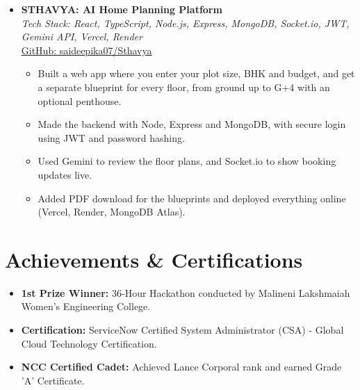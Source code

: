 \documentclass[letterpaper,11pt]{article}
\begin{document}
\begin{itemize}[leftmargin=0.15in, label={}]
\begin{itemize}
        \item Added JWT login, role-based access and private document storage on Cloudinary, and deployed it on Vercel, Render and MongoDB Atlas.
      \end{itemize}
    \item
      \textbf{STHAVYA: AI Home Planning Platform} \\
      \textit{Tech Stack: React, TypeScript, Node.js, Express, MongoDB, Socket.io, JWT, Gemini API, Vercel, Render} \\
      \href{https://github.com/saideepika07/Sthavya}{\underline{GitHub: saideepika07/Sthavya}}
      \begin{itemize}
        \item Built a web app where you enter your plot size, BHK and budget, and get a separate blueprint for every floor, from ground up to G+4 with an optional penthouse.
        \item Made the backend with Node, Express and MongoDB, with secure login using JWT and password hashing.
        \item Used Gemini to review the floor plans, and Socket.io to show booking updates live.
        \item Added PDF download for the blueprints and deployed everything online (Vercel, Render, MongoDB Atlas).
      \end{itemize}
  \end{itemize}

\section{Achievements \& Certifications}
 \begin{itemize}[leftmargin=0.15in]
    \item \textbf{1st Prize Winner:} 36-Hour Hackathon conducted by Malineni Lakshmaiah Women's Engineering College.
    \item \textbf{Certification:} ServiceNow Certified System Administrator (CSA) - Global Cloud Technology Certification.
    \item \textbf{NCC Certified Cadet:} Achieved Lance Corporal rank and earned Grade 'A' Certificate.
 \end{itemize}
\end{document}
